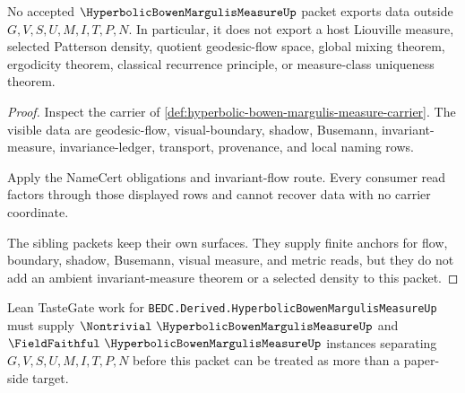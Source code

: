 \begin{theorem}
\label{thm:hyperbolic-bowen-margulis-measure-nonescape}
No accepted $\HyperbolicBowenMargulisMeasureUp$ packet exports data outside $G,V,S,U,M,I,T,P,N$. In particular, it does not export a host Liouville measure, selected Patterson density, quotient geodesic-flow space, global mixing theorem, ergodicity theorem, classical recurrence principle, or measure-class uniqueness theorem.
\end{theorem}
\begin{proof}
Inspect the carrier of \autoref{def:hyperbolic-bowen-margulis-measure-carrier}. The visible data are geodesic-flow, visual-boundary, shadow, Busemann, invariant-measure, invariance-ledger, transport, provenance, and local naming rows.

Apply the NameCert obligations and invariant-flow route. Every consumer read factors through those displayed rows and cannot recover data with no carrier coordinate.

The sibling packets keep their own surfaces. They supply finite anchors for flow, boundary, shadow, Busemann, visual measure, and metric reads, but they do not add an ambient invariant-measure theorem or a selected density to this packet.
\end{proof}



Lean TasteGate work for \texttt{BEDC.Derived.HyperbolicBowenMargulisMeasureUp} must supply $\Nontrivial\ \HyperbolicBowenMargulisMeasureUp$ and $\FieldFaithful\ \HyperbolicBowenMargulisMeasureUp$ instances separating $G,V,S,U,M,I,T,P,N$ before this packet can be treated as more than a paper-side target.

